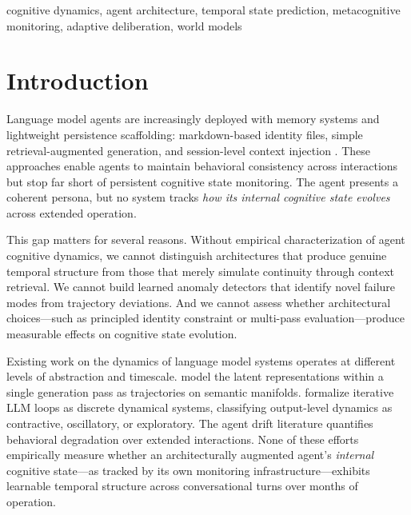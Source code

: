 \documentclass[twoside,11pt]{article}
\begin{document}
\begin{keywords}
  cognitive dynamics, agent architecture, temporal state prediction,
  metacognitive monitoring, adaptive deliberation, world models
\end{keywords}

\section{Introduction}
\label{sec:introduction}

Language model agents are increasingly deployed with memory systems and
lightweight persistence scaffolding: markdown-based identity files, simple
retrieval-augmented generation, and session-level context injection
\citep{park2023generative, shinn2023reflexion, wang2024survey}. These
approaches enable agents to maintain behavioral consistency across interactions
but stop far short of persistent cognitive state monitoring. The agent presents
a coherent persona, but no system tracks \emph{how its internal cognitive
state evolves} across extended operation.

This gap matters for several reasons. Without empirical characterization of
agent cognitive dynamics, we cannot distinguish architectures that produce
genuine temporal structure from those that merely simulate continuity through
context retrieval. We cannot build learned anomaly detectors that identify
novel failure modes from trajectory deviations. And we cannot assess whether
architectural choices---such as principled identity constraint or multi-pass
evaluation---produce measurable effects on cognitive state evolution.

Existing work on the dynamics of language model systems operates at different
levels of abstraction and timescale. \citet{dmet2025} model the latent
representations within a single generation pass as trajectories on semantic
manifolds. \citet{agenticloops2025} formalize iterative LLM loops as discrete
dynamical systems, classifying output-level dynamics as contractive,
oscillatory, or exploratory. The agent drift literature
\citep{rath2026drift} quantifies behavioral degradation over extended
interactions. None of these efforts empirically measure whether an
architecturally augmented agent's \emph{internal} cognitive state---as tracked
by its own monitoring infrastructure---exhibits learnable temporal structure
across conversational turns over months of operation.
\end{document}
